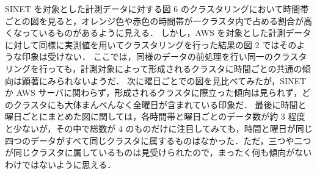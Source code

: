 \documentclass[a4j]{jarticle}
\begin{document}
SINET を対象とした計測データに対する図 6 のクラスタリングにおいて時間帯ごとの図を見ると，オレンジ色や赤色の時間帯が一クラスタ内で占める割合が高くなっているものがあるように見える．
しかし，AWS を対象とした計測データに対して同様に実測値を用いてクラスタリングを行った結果の図 2 ではそのような印象は受けない．
ここでは，同様のデータの前処理を行い同一のクラスタリングを行っても，計測対象によって形成されるクラスタに時間ごとの共通の傾向は顕著にみられないようだ．
次に曜日ごとでの図を見比べてみたが，SINET か AWS サーバに関わらず，形成されるクラスタに際立った傾向は見られず，どのクラスタにも大体まんべんなく全曜日が含まれている印象だ．
最後に時間と曜日ごとにまとめた図に関しては，各時間帯と曜日ごとのデータ数が約 3 程度と少ないが，その中で総数が 4 のものだけに注目してみても，時間と曜日が同じ四つのデータがすべて同じクラスタに属するものはなかった．ただ，三つや二つが同じクラスタに属しているものは見受けられたので，まったく何も傾向がないわけではないように思える．
\end{document}
